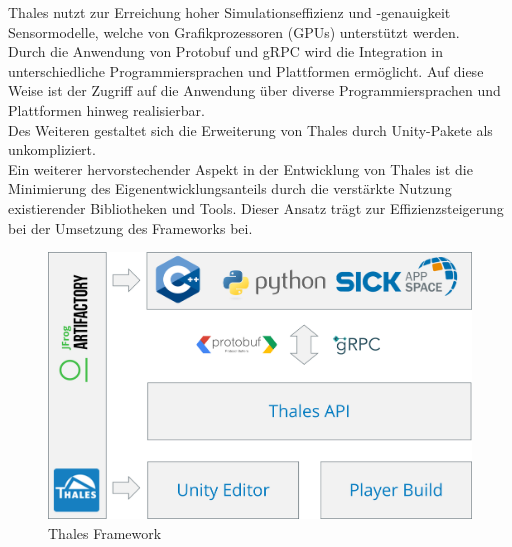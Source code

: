 Thales nutzt zur Erreichung hoher Simulationseffizienz und -genauigkeit Sensormodelle, welche von Grafikprozessoren (GPUs) unterstützt werden.\\

Durch die Anwendung von Protobuf und gRPC wird die Integration in unterschiedliche Programmiersprachen und Plattformen ermöglicht. Auf diese Weise ist der Zugriff auf die Anwendung über diverse Programmiersprachen und Plattformen hinweg realisierbar. \\

Des Weiteren gestaltet sich die Erweiterung von Thales durch Unity-Pakete als unkompliziert.\\

Ein weiterer hervorstechender Aspekt in der Entwicklung von Thales ist die Minimierung des Eigenentwicklungsanteils durch die verstärkte Nutzung existierender Bibliotheken und Tools. Dieser Ansatz trägt zur Effizienzsteigerung bei der Umsetzung des Frameworks bei.\cite{.02.09.2023}\\

\begin{figure}[htp]
    \centering
    \includegraphics[width=(\textwidth/2)]{images/Thales_Framework.png}
    \caption{Thales Framework}
    \label{fig:Thales-Framework}
\end{figure}


